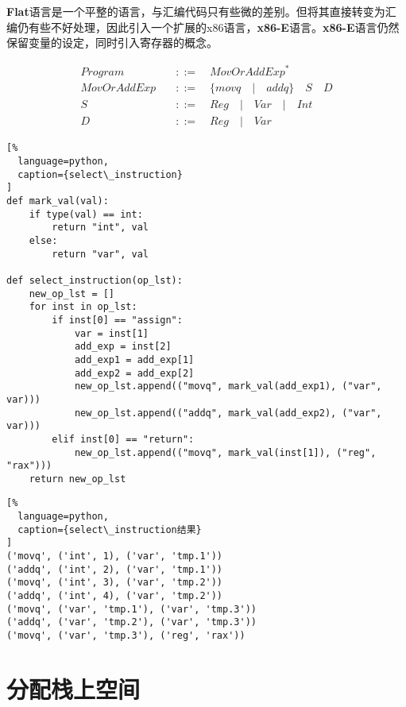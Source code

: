 \textbf{Flat}语言是一个平整的语言，与汇编代码只有些微的差别。但将其直接转变为汇编仍有些不好处理，因此引入一个扩展的x86语言，\textbf{x86-E}语言。\textbf{x86-E}语言仍然保留变量的设定，同时引入寄存器的概念。

\begin{equation}
\begin{aligned}
  \label{eq:4}
   Program \quad &::= \quad { MovOrAddExp }^* \\
   MovOrAddExp \quad &::= \quad \{ movq \quad | \quad addq \} \quad S \quad  D  \\
   S \quad &::= \quad Reg \quad | \quad Var \quad | \quad Int \\
   D \quad &::=  \quad Reg \quad | \quad Var
\end{aligned}
\end{equation}

\begin{lstlisting}[%
  language=python,
  caption={select\_instruction}
]
def mark_val(val):
    if type(val) == int:
        return "int", val
    else:
        return "var", val

def select_instruction(op_lst):
    new_op_lst = []
    for inst in op_lst:
        if inst[0] == "assign":
            var = inst[1]
            add_exp = inst[2]
            add_exp1 = add_exp[1]
            add_exp2 = add_exp[2]
            new_op_lst.append(("movq", mark_val(add_exp1), ("var", var)))
            new_op_lst.append(("addq", mark_val(add_exp2), ("var", var)))
        elif inst[0] == "return":
            new_op_lst.append(("movq", mark_val(inst[1]), ("reg", "rax")))
    return new_op_lst
\end{lstlisting}

\begin{lstlisting}[%
  language=python,
  caption={select\_instruction结果}
]
('movq', ('int', 1), ('var', 'tmp.1'))
('addq', ('int', 2), ('var', 'tmp.1'))
('movq', ('int', 3), ('var', 'tmp.2'))
('addq', ('int', 4), ('var', 'tmp.2'))
('movq', ('var', 'tmp.1'), ('var', 'tmp.3'))
('addq', ('var', 'tmp.2'), ('var', 'tmp.3'))
('movq', ('var', 'tmp.3'), ('reg', 'rax'))
\end{lstlisting}

\section{分配栈上空间}

